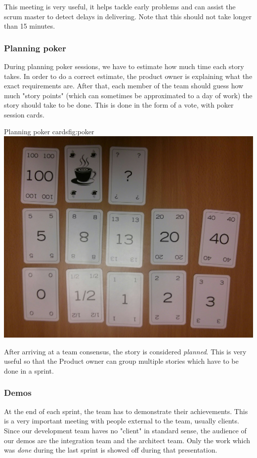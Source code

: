 This meeting is very useful, it helps tackle early problems and can assist the \gls{scrum} master to detect delays in delivering.
Note that this should not take longer than 15 minutes.


\subsubsection{Planning poker}
During planning poker sessions, we have to estimate how much time each story takes. In order to do a correct estimate,
the product owner is explaining what the exact requirements are. After that, each member of the team should guess
how much "story points" (which can sometimes be approximated to a day of work) the story should take to be done.
This is done in the form of a vote, with poker session cards.

\begin{figureGraphics}{Planning poker cards}{fig:poker}
\includegraphics[width=\textwidth]{./src/img/poker.jpg}
\end{figureGraphics}

After arriving at a team consensus, the story is considered \emph{planned}. This
is very useful so that the Product owner can group multiple stories which have
to be done in a sprint.


\subsubsection{Demos}
At the end of each sprint, the team has to demonstrate their achievements. This
is a very important meeting with people external to the team, usually clients.
Since our development team haves no "client" in standard sense, the audience of our demos are
the integration team and the architect team.
Only the work which was \emph{done} during the last sprint is showed off during that presentation.

